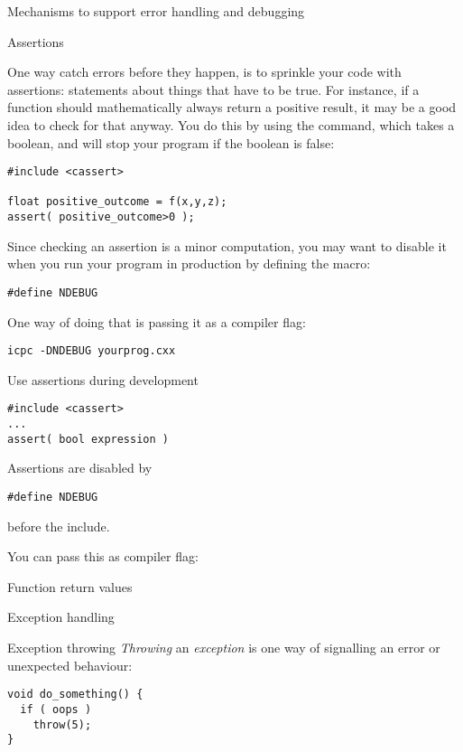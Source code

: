  {Mechanisms to support error handling and debugging}

 {Assertions}

One way catch errors before they happen, is to sprinkle your code with
assertions: statements about things that have to be true. For
instance, if a function should mathematically always return a positive
result, it may be a good idea to check for that anyway. You do this by
using the  command, which takes a boolean, and
will stop your program if the boolean is false:
\begin{lstlisting}
#include <cassert>

float positive_outcome = f(x,y,z);
assert( positive_outcome>0 );
\end{lstlisting}

Since checking an assertion is a minor computation, you may want to
disable it when you run your program in production by defining the
 macro:
\begin{lstlisting}
#define NDEBUG
\end{lstlisting}
One way of doing that is passing it as a compiler flag:
\begin{verbatim}
icpc -DNDEBUG yourprog.cxx
\end{verbatim}

\begin{slide}{Use assertions during development}
  \label{sl:cpp-assert}
\begin{lstlisting}
#include <cassert>
...
assert( bool expression )
\end{lstlisting}
Assertions are disabled by
\begin{lstlisting}
#define NDEBUG
\end{lstlisting}
before the include.

You can pass this as compiler flag:\\
\end{slide}

Function return values

 {Exception handling}

\begin{block}{Exception throwing}
  \label{sl:exception-throw}
  \emph{Throwing} an \emph{exception}%
   is one way of signalling an error or
  unexpected behaviour:
\begin{lstlisting}
void do_something() {
  if ( oops )
    throw(5);
}
\end{lstlisting}
\end{block}

